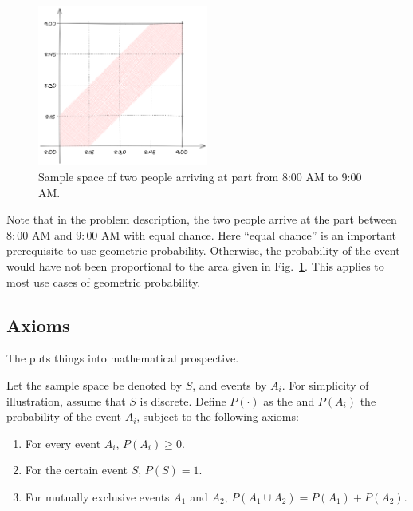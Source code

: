 \begin{figure}[!htb]
	\centering
	\includegraphics[width=0.5\textwidth]{chapters/part-1/figures/geometricprobexp.png}
	\caption{Sample space of two people arriving at part from 8:00 AM to 9:00 AM.} \label{fig:geometricprobexp}
\end{figure}

Note that in the problem description, the two people arrive at the part between $8:00$ AM and $9:00$ AM with equal chance. Here ``equal chance'' is an important prerequisite to use geometric probability. Otherwise, the probability of the event would have not been proportional to the area given in Fig.~\ref{fig:geometricprobexp}. This applies to most use cases of geometric probability.

\subsection{Axioms} \label{subsec:probability_axioms}

The  puts things into mathematical prospective. 

Let the sample space be denoted by $S$, and events by $A_i$. For simplicity of illustration, assume that $S$ is discrete. Define $P(\cdot)$ as the  and $P(A_i)$ the probability of the event $A_i$, subject to the following axioms:
\begin{enumerate}
  \item For every event $A_i$, $P(A_i)\geq 0$.
  \item For the certain event $S$, $P(S)=1$.
  \item For mutually exclusive events $A_1$ and $A_2$, $P\left(A_1\cup A_2\right) = P(A_1)+P(A_2)$.
\end{enumerate}

